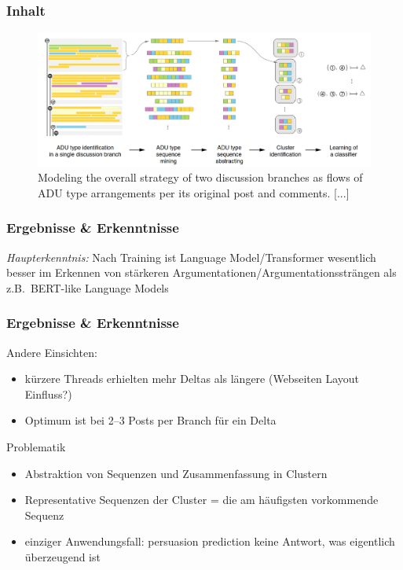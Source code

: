 \documentclass[compress,12pt]{beamer}
\begin{document}
    \begin{frame}
        \frametitle{Inhalt}
        \begin{figure}
            \centering
            \includegraphics[width=\textwidth]{../images/sequencing}
            \caption{Modeling the overall strategy of two discussion branches as flows of ADU type arrangements per its original post and comments. [...]}
            \label{fig:adu-sequencing}
        \end{figure}
    \end{frame}

    \begin{frame}
        \frametitle{Ergebnisse \& Erkenntnisse}
        \textit{Haupterkenntnis:} Nach Training ist Language Model/Transformer wesentlich besser im Erkennen von stärkeren Argumentationen/Argumentationssträngen als z.B.\ BERT-like Language Models
    \end{frame}

    \begin{frame}
        \frametitle{Ergebnisse \& Erkenntnisse}
        Andere Einsichten:
        \begin{itemize}
            \item kürzere Threads erhielten mehr Deltas als längere (Webseiten Layout Einfluss?)
            \item Optimum ist bei 2--3 Posts per Branch für ein Delta
        \end{itemize}
    \end{frame}

    \begin{frame}{Problematik}
        \begin{itemize}
            \item Abstraktion von Sequenzen und Zusammenfassung in Clustern
            \item Representative Sequenzen der Cluster = die am häufigsten vorkommende Sequenz
            \item einziger Anwendungsfall: persuasion prediction \textrightarrow{} keine Antwort, was eigentlich überzeugend ist
        \end{itemize}
    \end{frame}
\end{document}
